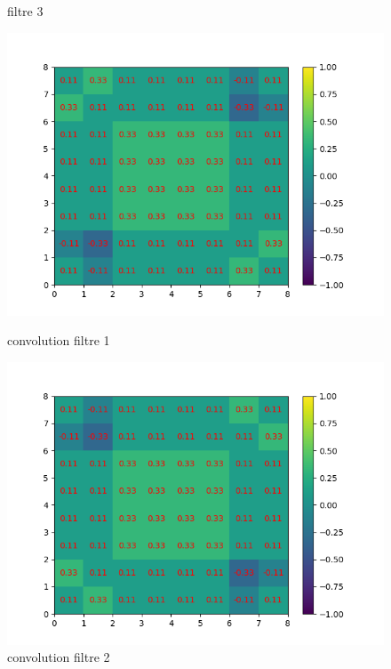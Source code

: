 \begin{figure}[!htb]
        \caption{filtre 3}
    \endminipage
\end{figure}

\newpage

\begin{figure}[h]
        \includegraphics[width=\textwidth]{img/cnn_exemple/square/convolution_filtre_1.png}
        \caption{convolution filtre 1}
    \endminipage\hfill
        \includegraphics[width=\textwidth]{img/cnn_exemple/square/convolution_filtre_2.png}
        \caption{convolution filtre 2}
    \endminipage\hfill

\end{figure}
